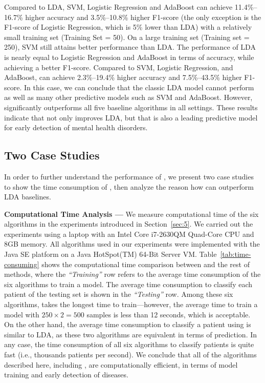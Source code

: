 
Compared to LDA, SVM, Logistic Regression and AdaBoost can achieve 11.4\%--16.7\% higher accuracy and 3.5\%--10.8\% higher F1-score (the only exception is the F1-score of Logistic Regression, which is 5\% lower than LDA) with a relatively small training set (Training Set = 50). 
On a large training set (Training set = 250), SVM still attains better performance than LDA.
The performance of LDA is nearly equal to Logistic Regression and AdaBoost in terms of accuracy, while achieving a better F1-score.
Compared to SVM, Logistic Regression, and AdaBoost, \TheName{} can achieve 2.3\%--19.4\% higher accuracy and 7.5\%--43.5\% higher F1-score. 
In this case, we can conclude that the classic LDA model cannot perform as well as many other predictive models such as SVM and AdaBoost. However, \TheName{} significantly outperforms all five baseline algorithms in all settings. 
These results indicate that \TheName{} not only improves LDA, but that \TheName{} is also a leading predictive model for early detection of mental health disorders. 



\subsection{Two Case Studies}
In order to further understand the performance of \TheName{}, we present two case studies to show the time consumption of \TheName{}, then analyze the reason how \TheName{} can outperform LDA baselines.

\textbf{Computational Time Analysis --- } We measure computational time  of the six algorithms in the experiments introduced in Section~\ref{sec:5}. We carried out the experiments using a laptop with an Intel Core i7-2630QM Quad-Core CPU and 8GB memory. All algorithms used in our experiments were implemented with the Java SE platform on a Java HotSpot(TM) 64-Bit Server VM. Table~\ref{tab:time-consuming} shows the computational time comparison between \TheName{} and the rest of methods, where the \emph{``Training''} row refers to the average time consumption of the six algorithms to train a model.  
The average time consumption to classify each patient of the testing set is shown in the \emph{``Testing''} row. 
Among these six algorithms, \TheName{} takes the longest time to train---however, the average time to train a model with $250\times 2=500$ samples is less than 12 seconds, which is acceptable. 
On the other hand, the average time consumption to classify a patient using \TheName{} is similar to LDA, as these two algorithms are equivalent in terms of prediction. 
In any case, the time consumption of all six algorithms to classify patients is quite fast   (i.e., thousands patients per second). 
We conclude that all of the algorithms described here, including \TheName{}, are computationally efficient, in terms of model training and early detection of diseases.

